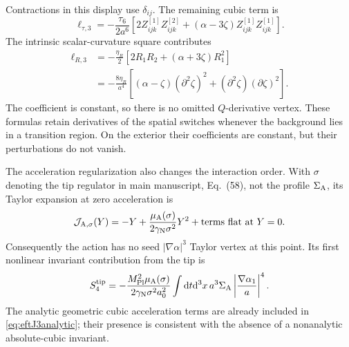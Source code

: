 \documentclass[aps,prd,reprint,onecolumn,notitlepage,nofootinbib,longbibliography,floatfix]{revtex4-2}
\theoremstyle{scstyle}
\theoremstyle{definition}
\theoremstyle{remark}
\newcommand{\dd}{\mathrm{d}}
\newcommand{\mpl}{M_{\rm Pl}}
\newcommand{\cJs}{{\mathcal J_{\rm A,\sigma}}}
\newcommand{\etaR}{\eta_R}
\begin{document}
Contractions in this display use $\delta_{ij}$. The remaining cubic term is
\begin{equation}
\ell_{\tau,3}=-\frac{\tau_6}{2a^6}
\left[2Z^{[1]}_{ijk}Z^{[2]}_{ijk}
+(\alpha-3\zeta)Z^{[1]}_{ijk}Z^{[1]}_{ijk}\right].
\label{eq:fullTauCubic}
\end{equation}
The intrinsic scalar-curvature square contributes
\begin{align}
\ell_{R,3}&=-\frac{\etaR}{2}
 [2R_1R_2+(\alpha+3\zeta)R_1^2]\nonumber\\
&=-\frac{8\etaR}{a^4}
 [(\alpha-\zeta)(\partial^2\zeta)^2
  +(\partial^2\zeta)(\partial\zeta)^2].
\label{eq:curvatureCubic}
\end{align}
The coefficient is constant, so there is no omitted $Q$-derivative
vertex. These formulas retain derivatives of the spatial switches whenever the
background lies in a transition region. On the exterior their coefficients
are constant, but their perturbations do not vanish.

The acceleration regularization also changes the interaction order. With
$\sigma$ denoting the tip regulator in main manuscript, Eq.~(58), not the
profile $\Sigma_{\rm A}$, its Taylor expansion at zero acceleration is
\begin{equation}
\cJs(Y)=-Y+\frac{\mu_{\rm A}(\sigma)}{2\gamma_{\rm N}\sigma^2}Y^2
+\text{terms flat at }Y=0.
\label{eq:fullTipTaylor}
\end{equation}
Consequently the action has no seed $|\nabla\alpha|^3$ Taylor vertex at this
point. Its first nonlinear invariant contribution from the tip is
\begin{equation}
S^{\rm tip}_4=-\frac{\mpl^2\mu_{\rm A}(\sigma)}
 {2\gamma_{\rm N}\sigma^2a_0^2}
\int\dd t\dd^3x\,a^3\Sigma_{\rm A}
\left|\frac{\nabla\alpha_1}{a}\right|^4.
\label{eq:fullTipQuartic}
\end{equation}
The analytic geometric cubic acceleration terms are already included in
\cref{eq:eftJ3analytic}; their presence is consistent with the absence of
a nonanalytic absolute-cubic invariant.
\end{document}
